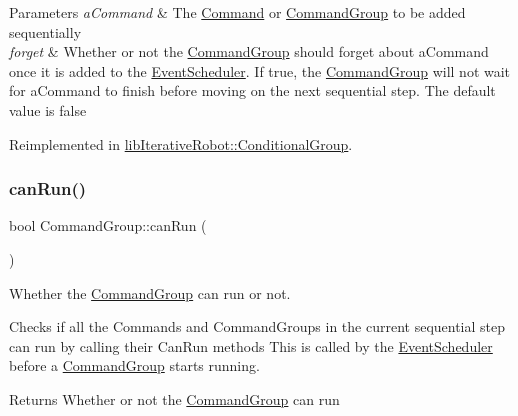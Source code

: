 \begin{DoxyParams}{Parameters}
{\em a\+Command} & The \mbox{\hyperlink{classlib_iterative_robot_1_1_command}{Command}} or \mbox{\hyperlink{classlib_iterative_robot_1_1_command_group}{Command\+Group}} to be added sequentially \\
\hline
{\em forget} & Whether or not the \mbox{\hyperlink{classlib_iterative_robot_1_1_command_group}{Command\+Group}} should forget about a\+Command once it is added to the \mbox{\hyperlink{classlib_iterative_robot_1_1_event_scheduler}{Event\+Scheduler}}. If true, the \mbox{\hyperlink{classlib_iterative_robot_1_1_command_group}{Command\+Group}} will not wait for a\+Command to finish before moving on the next sequential step. The default value is false \\
\hline
\end{DoxyParams}


Reimplemented in \mbox{\hyperlink{classlib_iterative_robot_1_1_conditional_group_a89bd86d87a13af725243d2f0ade46df6}{lib\+Iterative\+Robot\+::\+Conditional\+Group}}.

\mbox{\label{classlib_iterative_robot_1_1_command_group_abd75c9b52e6b4ae5af1b6724e865311f}} 
\subsubsection{\texorpdfstring{canRun()}{canRun()}}
{\footnotesize\ttfamily bool Command\+Group\+::can\+Run (\begin{DoxyParamCaption}{ }\end{DoxyParamCaption})\hspace{0.3cm}{\ttfamily [virtual]}}



Whether the \mbox{\hyperlink{classlib_iterative_robot_1_1_command_group}{Command\+Group}} can run or not. 

Checks if all the Commands and Command\+Groups in the current sequential step can run by calling their Can\+Run methods This is called by the \mbox{\hyperlink{classlib_iterative_robot_1_1_event_scheduler}{Event\+Scheduler}} before a \mbox{\hyperlink{classlib_iterative_robot_1_1_command_group}{Command\+Group}} starts running. \begin{DoxyReturn}{Returns}
Whether or not the \mbox{\hyperlink{classlib_iterative_robot_1_1_command_group}{Command\+Group}} can run 
\end{DoxyReturn}


